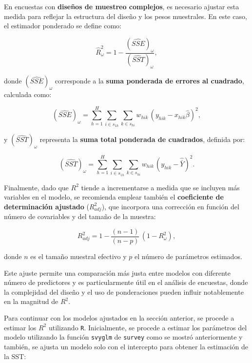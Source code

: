 \documentclass[
  spanish,
  12pt,
]{book}
\begin{document}
En encuestas con \textbf{diseños de muestreo complejos}, es necesario ajustar esta medida para reflejar la estructura del diseño y los pesos muestrales. En este caso, el estimador ponderado se define como:

\[
\hat{R}_\omega^2 = 1 - \frac{(\widehat{SSE})_\omega}{(\widehat{SST})_\omega},
\]

donde \((\widehat{SSE})_\omega\) corresponde a la \textbf{suma ponderada de errores al cuadrado}, calculada como:

\[
(\widehat{SSE})_\omega = \sum_{h=1}^{H} \sum_{i \in s_{1h}} \sum_{k \in s_{hi}} w_{hik} \,(y_{hik} - x_{hik}\hat{\beta})^2,
\]

y \((\widehat{SST})_\omega\) representa la \textbf{suma total ponderada de cuadrados}, definida por:

\[
(\widehat{SST})_\omega = \sum_{h=1}^{H} \sum_{i \in s_{1h}} \sum_{k \in s_{hi}} w_{hik}\,(y_{hik} - \hat{\bar{Y}})^2.
\]

Finalmente, dado que \(R^{2}\) tiende a incrementarse a medida que se incluyen más variables en el modelo, se recomienda emplear también el \textbf{coeficiente de determinación ajustado} (\(R_{adj}^{2}\)), que incorpora una corrección en función del número de covariables y del tamaño de la muestra:

\[
R_{adj}^{2} = 1 - \frac{(n-1)}{(n-p)} \,(1 - R_{\omega}^{2}),
\]

donde \(n\) es el tamaño muestral efectivo y \(p\) el número de parámetros estimados.

Este ajuste permite una comparación más justa entre modelos con diferente número de predictores y es particularmente útil en el análisis de encuestas, donde la complejidad del diseño y el uso de ponderaciones pueden influir notablemente en la magnitud de \(R^{2}\).

Para continuar con los modelos ajustados en la sección anterior, se procede a estimar los \(R^{2}\) utilizando \texttt{R}. Inicialmente, se procede a estimar los parámetros del modelo utilizando la función \texttt{svyglm} de \texttt{survey} como se mostró anteriormente y también, se ajusta un modelo solo con el intercepto para obtener la estimación de la SST:
\end{document}
